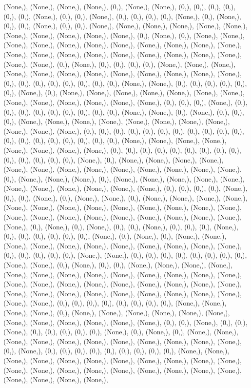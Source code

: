 \documentclass{article}
\begin{document}
(None,), (None,), (None,), (None,), (0,), (None,), (None,), (0,), (0,), (0,), (0,), (0,), (0,), (None,), (0,), (0,), (None,), (0,), (0,), (0,), (0,), (None,), (0,), (None,), (0,), (0,), (None,), (0,), (0,), (None,), (None,), (None,), (None,), (None,), (None,), (None,), (None,), (None,), (None,), (None,), (0,), (None,), (0,), (None,), (None,), (None,), (None,), (None,), (None,), (None,), (None,), (None,), (None,), (None,), (None,), (None,), (None,), (None,), (None,), (None,), (None,), (None,), (None,), (None,), (None,), (0,), (None,), (0,), (0,), (0,), (0,), (None,), (None,), (None,), (None,), (None,), (None,), (None,), (None,), (None,), (None,), (None,), (None,), (0,), (0,), (0,), (0,), (0,), (0,), (0,), (0,), (None,), (None,), (0,), (0,), (0,), (0,), (0,), (0,), (None,), (0,), (None,), (None,), (None,), (None,), (None,), (None,), (None,), (None,), (None,), (None,), (None,), (None,), (None,), (0,), (0,), (0,), (None,), (0,), (0,), (0,), (0,), (0,), (0,), (0,), (0,), (0,), (None,), (None,), (0,), (None,), (0,), (0,), (0,), (None,), (None,), (None,), (None,), (None,), (None,), (None,), (None,), (None,), (None,), (None,), (0,), (0,), (0,), (0,), (0,), (0,), (0,), (0,), (0,), (0,), (0,), (0,), (0,), (0,), (0,), (0,), (0,), (0,), (0,), (None,), (None,), (None,), (None,), (None,), (None,), (None,), (None,), (0,), (0,), (0,), (0,), (0,), (0,), (0,), (0,), (0,), (0,), (0,), (0,), (0,), (0,), (None,), (0,), (None,), (None,), (None,), (None,), (None,), (None,), (None,), (None,), (None,), (None,), (None,), (None,), (None,), (0,), (None,), (None,), (None,), (0,), (None,), (None,), (None,), (None,), (None,), (None,), (None,), (None,), (None,), (None,), (None,), (0,), (0,), (0,), (0,), (None,), (0,), (0,), (None,), (0,), (None,), (None,), (0,), (None,), (None,), (None,), (None,), (None,), (None,), (None,), (None,), (None,), (None,), (None,), (None,), (None,), (None,), (None,), (None,), (None,), (None,), (None,), (None,), (None,), (None,), (None,), (0,), (None,), (0,), (None,), (0,), (0,), (None,), (0,), (0,), (0,), (None,), (0,), (0,), (0,), (0,), (0,), (0,), (None,), (0,), (None,), (0,), (None,), (None,), (None,), (None,), (None,), (None,), (None,), (None,), (None,), (None,), (None,), (0,), (0,), (0,), (0,), (0,), (None,), (None,), (0,), (0,), (0,), (0,), (0,), (0,), (0,), (0,), (None,), (None,), (0,), (None,), (0,), (0,), (None,), (None,), (None,), (None,), (None,), (None,), (None,), (None,), (None,), (None,), (None,), (None,), (None,), (None,), (None,), (None,), (None,), (None,), (None,), (None,), (None,), (None,), (None,), (None,), (None,), (None,), (None,), (None,), (None,), (None,), (None,), (None,), (None,), (0,), (0,), (0,), (0,), (0,), (0,), (0,), (0,), (None,), (None,), (None,), (None,), (0,), (None,), (None,), (None,), (None,), (None,), (None,), (None,), (None,), (None,), (None,), (None,), (None,), (0,), (0,), (None,), (0,), (0,), (None,), (0,), (0,), (0,), (0,), (0,), (None,), (0,), (None,), (0,), (None,), (None,), (None,), (None,), (None,), (None,), (None,), (None,), (None,), (None,), (None,), (0,), (None,), (0,), (0,), (0,), (0,), (0,), (0,), (0,), (0,), (0,), (None,), (None,), (None,), (None,), (None,), (None,), (None,), (None,), (None,), (None,), (None,), (None,), (None,), (None,), (None,), (None,), (None,), (None,), (None,), (None,), (None,), (None,), (None,), (None,), 
\end{document}

